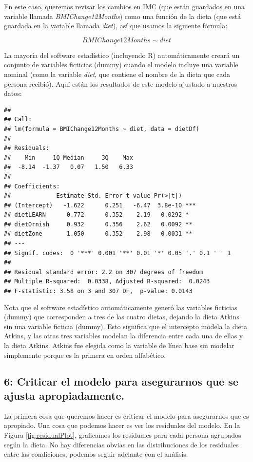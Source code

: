\documentclass[
  12pt,
]{book}
\begin{document}
En este caso, queremos revisar los cambios en IMC (que están guardados en una variable llamada \emph{BMIChange12Months}) como una función de la dieta (que está guardada en la variable llamada \emph{diet}), así que usamos la siguiente fórmula:

\[
BMIChange12Months \sim diet
\]

La mayoría del software estadístico (incluyendo R) automáticamente creará un conjunto de variables ficticias (dummy) cuando el modelo incluye una variable nominal (como la variable \emph{diet}, que contiene el nombre de la dieta que cada persona recibió). Aquí están los resultados de este modelo ajustado a nuestros datos:

\begin{verbatim}
## 
## Call:
## lm(formula = BMIChange12Months ~ diet, data = dietDf)
## 
## Residuals:
##    Min     1Q Median     3Q    Max 
##  -8.14  -1.37   0.07   1.50   6.33 
## 
## Coefficients:
##             Estimate Std. Error t value Pr(>|t|)    
## (Intercept)   -1.622      0.251   -6.47  3.8e-10 ***
## dietLEARN      0.772      0.352    2.19   0.0292 *  
## dietOrnish     0.932      0.356    2.62   0.0092 ** 
## dietZone       1.050      0.352    2.98   0.0031 ** 
## ---
## Signif. codes:  0 '***' 0.001 '**' 0.01 '*' 0.05 '.' 0.1 ' ' 1
## 
## Residual standard error: 2.2 on 307 degrees of freedom
## Multiple R-squared:  0.0338,	Adjusted R-squared:  0.0243 
## F-statistic: 3.58 on 3 and 307 DF,  p-value: 0.0143
\end{verbatim}

Nota que el software estadístico automáticamente generó las variables ficticias (dummy) que corresponden a tres de las cuatro dietas, dejando la dieta Atkins sin una variable ficticia (dummy). Esto significa que el intercepto modela la dieta Atkins, y las otras tres variables modelan la diferencia entre cada una de ellas y la dieta Atkins. Atkins fue elegida como la variable de línea base sin modelar simplemente porque es la primera en orden alfabético.

\hypertarget{criticar-el-modelo-para-asegurarnos-que-se-ajusta-apropiadamente.}{%
\subsection{6: Criticar el modelo para asegurarnos que se ajusta apropiadamente.}\label{criticar-el-modelo-para-asegurarnos-que-se-ajusta-apropiadamente.}}

La primera cosa que queremos hacer es criticar el modelo para asegurarnos que es apropiado. Una cosa que podemos hacer es ver los residuales del modelo. En la Figura \ref{fig:residualPlot}, graficamos los residuales para cada persona agrupados según la dieta. No hay diferencias obvias en las distribuciones de los residuales entre las condiciones, podemos seguir adelante con el análisis.
\end{document}
